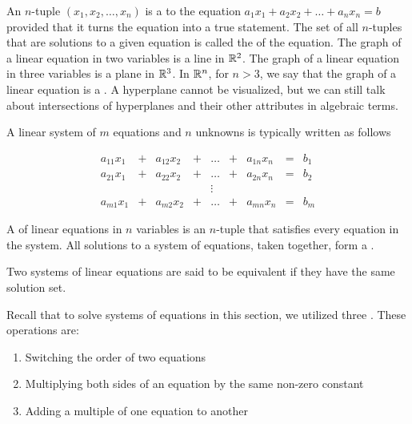 \documentclass{ximera}
\begin{document}
An $n$-tuple $(x_1, x_2,\ldots ,x_n)$ is a  to the equation $a_1x_1+a_2x_2+\ldots +a_nx_n=b$ provided that it turns the equation into a true statement.  The set of all $n$-tuples that are solutions to a given equation is called the  of the equation. The graph of a linear equation in two variables is a line in $\mathbb{R}^2$.  The graph of a linear equation in three variables is a plane in $\mathbb{R}^3$.  In $\mathbb{R}^n$, for $n>3$, we say that the graph of a linear equation is a . A hyperplane cannot be visualized, but we can still talk about intersections of hyperplanes and their other attributes in algebraic terms.  

A linear system of $m$ equations and $n$ unknowns is typically written as follows

$$\begin{array}{ccccccccc}
      a_{11}x_1 &+ &a_{12}x_2&+&\ldots&+&a_{1n}x_n&= &b_1 \\
	 a_{21}x_1 &+ &a_{22}x_2&+&\ldots&+&a_{2n}x_n&= &b_2 \\
     &&&&\vdots&&&& \\
     a_{m1}x_1 &+ &a_{m2}x_2&+&\ldots&+&a_{mn}x_n&= &b_m
    \end{array}$$


A  of linear equations in $n$ variables is an $n$-tuple that satisfies every equation in  the system.  All solutions to a system of equations, taken together, form a .

\begin{definition}\label{def:equivsystems} Two systems of linear equations are said to be equivalent if they have the same solution set.
\end{definition}

Recall that to solve systems of equations in this section, we utilized three .  These operations are:
\begin{enumerate}
\item\label{item:rowswap} Switching the order of two equations
\item\label{item:constantmult} Multiplying both sides of an equation by the same non-zero constant
\item\label{item:addrow} Adding a multiple of one equation to another
\end{enumerate}
\end{document}
